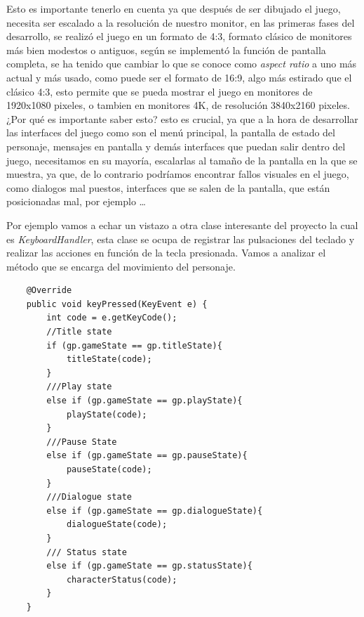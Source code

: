 \documentclass[a4paper]{article}
\begin{document}
Esto es importante tenerlo en cuenta ya que después de ser dibujado el juego, necesita ser escalado a la resolución de nuestro monitor, en las primeras fases del desarrollo, se realizó el juego en un formato de 4:3,
formato clásico de monitores más bien modestos o antiguos, según se implementó la función de pantalla completa, se ha tenido que cambiar lo que se conoce como \textit{aspect ratio} a uno más actual y más usado, como puede
ser el formato de 16:9, algo más estirado que el clásico 4:3, esto permite que se pueda mostrar el juego en monitores de 1920x1080 pixeles, o tambien en monitores 4K, de resolución 3840x2160 pixeles. ¿Por qué es importante saber esto?
esto es crucial, ya que a la hora de desarrollar las interfaces del juego como son el menú principal, la pantalla de estado del personaje, mensajes en pantalla y demás interfaces que puedan salir dentro del juego, necesitamos en su
mayoría, escalarlas al tamaño de la pantalla en la que se muestra, ya que, de lo contrario podríamos encontrar fallos visuales en el juego, como dialogos mal puestos, interfaces que se salen de la pantalla, que están posicionadas mal, por ejemplo \dots \\


\clearpage

Por ejemplo vamos a echar un vistazo a otra clase interesante del proyecto la cual es \textit{KeyboardHandler}, esta clase se ocupa de registrar las pulsaciones del teclado y realizar las acciones en función de la tecla
presionada. Vamos a analizar el método que se encarga del movimiento del personaje.
\begin{lstlisting}
    @Override
    public void keyPressed(KeyEvent e) {
        int code = e.getKeyCode();
        //Title state
        if (gp.gameState == gp.titleState){
            titleState(code);
        }
        ///Play state
        else if (gp.gameState == gp.playState){
            playState(code);
        }
        ///Pause State
        else if (gp.gameState == gp.pauseState){
            pauseState(code);
        }
        ///Dialogue state
        else if (gp.gameState == gp.dialogueState){
            dialogueState(code);
        }
        /// Status state
        else if (gp.gameState == gp.statusState){
            characterStatus(code);
        }
    }
\end{lstlisting}
\end{document}
